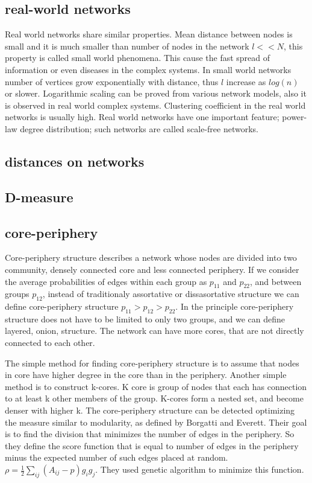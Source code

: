 \subsection{real-world networks}
Real world networks share similar properties. Mean distance between nodes is small and it is much smaller than number of nodes in the network $l << N$, this property is called small world phenomena. This cause the fast spread of information or even diseases in the complex systems. In small world networks number of vertices grow exponentially with distance, thus $l$ increase as $log(n)$ or slower. Logarithmic scaling can be proved from various network models, also it is observed in real world complex systems. Clustering coefficient in the real world networks is usually high. Real world networks have one important feature; power-law degree distribution; such networks are called scale-free networks.

\subsection{distances on networks}

\subsection{D-measure}

\subsection{core-periphery}

Core-periphery structure describes a network whose nodes are divided into two community, densely connected core and less connected periphery. If we consider the average probabilities of edges within each group as $p_{11}$ and $p_{22}$, and between groups $p_{12}$, instead of traditionaly assortative or dissasortative structure we can define core-periphery structure $p_{11}> p_{12} > p_{22}$. In the principle core-periphery structure does not have to be limited to only two groups, and we can define layered, onion, structure. The network can have more cores, that are not directly connected to each other. 

The simple method for finding core-periphery structure is to assume that nodes in core have higher degree in the core than in the periphery. Another simple method is to construct k-cores. K core is group of nodes that each has connection to at least k other members of the group. K-cores form a nested set, and become denser with higher k. The core-periphery structure can be detected optimizing the measure similar to modularity, as defined by Borgatti and Everett. Their goal is to find the division that minimizes the number of edges in the periphery. So they define the score function that is equal to number of edges in the periphery minus the expected number of such edges placed at random. $\rho = \frac{1}{2}\sum_{ij}(A_{ij}-p)g_ig_j$. They used genetic algorithm to minimize this function. 


